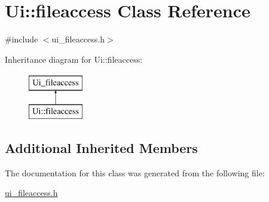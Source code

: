 \hypertarget{classUi_1_1fileaccess}{\section{Ui\-:\-:fileaccess Class Reference}
\label{classUi_1_1fileaccess}
}


{\ttfamily \#include $<$ui\-\_\-fileaccess.\-h$>$}

Inheritance diagram for Ui\-:\-:fileaccess\-:\begin{figure}[H]
\begin{center}
\leavevmode
\includegraphics[height=2.000000cm]{classUi_1_1fileaccess}
\end{center}
\end{figure}
\subsection*{Additional Inherited Members}


The documentation for this class was generated from the following file\-:\begin{DoxyCompactItemize}
\item 
\hyperlink{ui__fileaccess_8h}{ui\-\_\-fileaccess.\-h}\end{DoxyCompactItemize}
